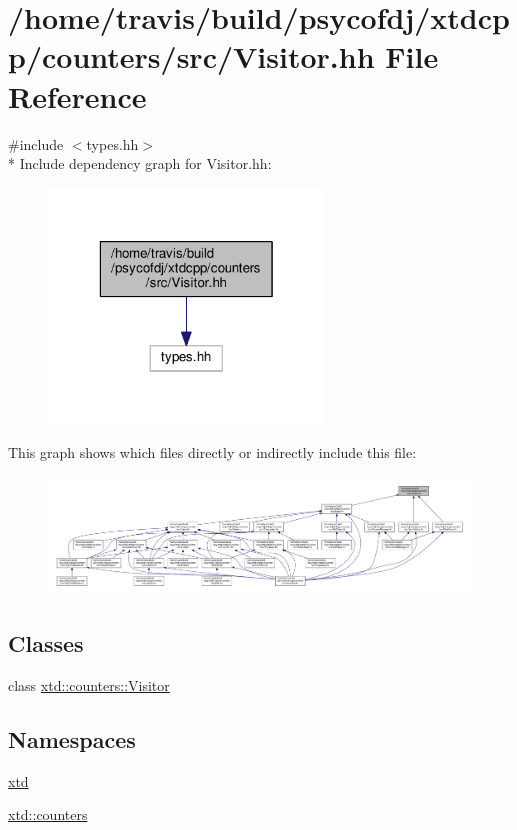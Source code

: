 \hypertarget{Visitor_8hh}{\section{/home/travis/build/psycofdj/xtdcpp/counters/src/\-Visitor.hh File Reference}
\label{Visitor_8hh}
}
{\ttfamily \#include $<$types.\-hh$>$}\\*
Include dependency graph for Visitor.\-hh\-:
\nopagebreak
\begin{figure}[H]
\begin{center}
\leavevmode
\includegraphics[width=208pt]{Visitor_8hh__incl}
\end{center}
\end{figure}
This graph shows which files directly or indirectly include this file\-:
\nopagebreak
\begin{figure}[H]
\begin{center}
\leavevmode
\includegraphics[width=350pt]{Visitor_8hh__dep__incl}
\end{center}
\end{figure}
\subsection*{Classes}
\begin{DoxyCompactItemize}
\item 
class \hyperlink{classxtd_1_1counters_1_1Visitor}{xtd\-::counters\-::\-Visitor}
\end{DoxyCompactItemize}
\subsection*{Namespaces}
\begin{DoxyCompactItemize}
\item 
\hyperlink{namespacextd}{xtd}
\item 
\hyperlink{namespacextd_1_1counters}{xtd\-::counters}
\end{DoxyCompactItemize}
